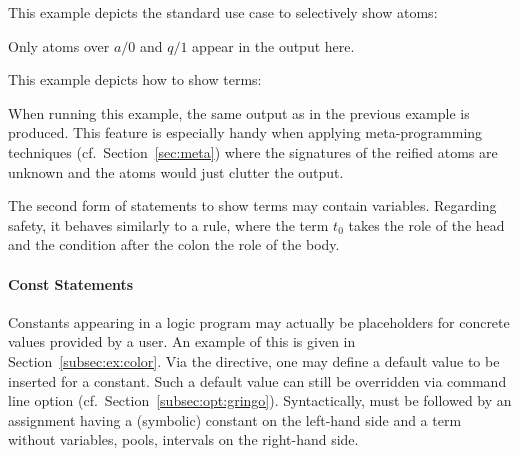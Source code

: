 \begin{example}
This example depicts the standard use case to selectively show atoms:

Only atoms over $a/0$ and $q/1$ appear in the output here.
\eexample
\end{example}

\begin{example}
This example depicts how to show terms:
%

%
When running this example,
the same output as in the previous example is produced.
This feature is especially handy when applying meta-programming techniques (cf.~Section~\ref{sec:meta})
where the signatures of the reified atoms are unknown and the  atoms would just clutter the output.
\eexample
\end{example}

\begin{note}
The second form of  statements to show terms may contain variables.
Regarding safety, it behaves similarly to a rule,
where the term $t_0$ takes the role of the head
and the condition after the colon the role of the body.
\end{note}

\paragraph{Const Statements}
%
Constants appearing in a logic program may actually be placeholders for
concrete values provided by a user.
An example of this is given in Section~\ref{subsec:ex:color}.
Via the  directive,
one may define a default value to be inserted for a constant.
Such a default value can still be overridden via command line option
 (cf.\ Section~\ref{subsec:opt:gringo}).
Syntactically,  must be followed by an assignment having
a (symbolic) constant on the left-hand side and a term without variables, pools, intervals on the right-hand side.

